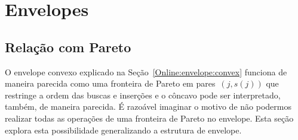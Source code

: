 \chapter{Envelopes} \label{Envelopes}

\section{Relação com Pareto}

O envelope convexo explicado na Seção~\ref{Online:envelope:convex} funciona de maneira parecida como uma fronteira de Pareto em pares~$(j,s(j))$ que restringe a ordem das buscas e inserções e o côncavo pode ser interpretado, também, de maneira parecida. É razoável imaginar o motivo de não podermos realizar todas as operações de uma fronteira de Pareto no envelope. Esta seção explora esta possibilidade generalizando a estrutura de envelope.
